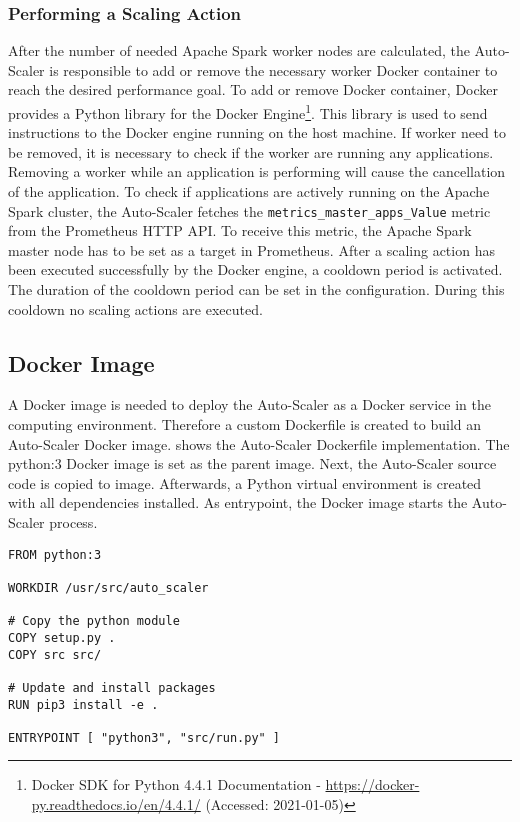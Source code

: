 \subsubsection{Performing a Scaling Action}
After the number of needed Apache Spark worker nodes are calculated, the Auto-Scaler is responsible to add or remove the necessary worker Docker container to reach the desired performance goal.
To add or remove Docker container, Docker provides a Python library for the Docker Engine\footnote{Docker SDK for Python 4.4.1 Documentation - \url{https://docker-py.readthedocs.io/en/4.4.1/} (Accessed: 2021-01-05)}. This library is used to send instructions to the Docker engine running on the host machine.
If worker need to be removed, it is necessary to check if the worker are running any applications. Removing a worker while an application is performing will cause the cancellation of the application.
To check if applications are actively running on the Apache Spark cluster, the Auto-Scaler fetches the \texttt{metrics\_master\_apps\_Value} metric from the Prometheus HTTP API. To receive this metric, the Apache Spark master node has to be set as a target in Prometheus.
After a scaling action has been executed successfully by the Docker engine, a cooldown period is activated. The duration of the cooldown period can be set in the configuration. During this cooldown no scaling actions are executed.


\subsection{Docker Image}
A Docker image is needed to deploy the Auto-Scaler as a Docker service in the computing environment. Therefore a custom Dockerfile is created to build an Auto-Scaler Docker image.
 shows the Auto-Scaler Dockerfile implementation. The python:3 Docker image is set as the parent image. 
Next, the Auto-Scaler source code is copied to image. Afterwards, a Python virtual environment is created with all dependencies installed.
As entrypoint, the Docker image starts the Auto-Scaler process.
\begin{lstlisting}[label=lst:06_auto-scaler_dockerfile, caption=Auto-Scaler Dockerfile]
FROM python:3
 
WORKDIR /usr/src/auto_scaler
 
# Copy the python module
COPY setup.py .
COPY src src/
 
# Update and install packages
RUN pip3 install -e .
 
ENTRYPOINT [ "python3", "src/run.py" ]
\end{lstlisting}


